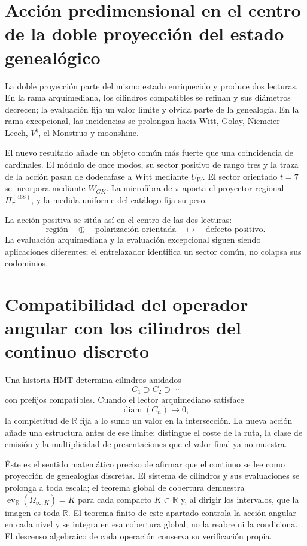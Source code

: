 \section{Acción predimensional en el centro de la doble proyección del estado genealógico}

La doble proyección parte del mismo estado enriquecido y produce dos
lecturas. En la rama arquimediana, los cilindros compatibles se refinan y
sus diámetros decrecen; la evaluación fija un valor límite y olvida parte
de la genealogía. En la rama excepcional, las incidencias se prolongan hacia
Witt, Golay, Niemeier--Leech, \(V^\natural\), el Monstruo y moonshine.

El nuevo resultado añade un objeto común más fuerte que una coincidencia de
cardinales. El módulo de once modos, su sector positivo de rango tres y la
traza de la acción pasan de dodecafase a Witt mediante \(U_W\). El sector orientado
\(t=7\) se incorpora mediante \(W_{GK}\). La microfibra de
\(\pi\) aporta el proyector regional \(\Pi_\pi^{(468)}\), y la medida uniforme del
catálogo fija su peso.

La acción positiva se sitúa así en el centro de las dos lecturas:
\[
 \text{región}
 \quad\oplus\quad
 \text{polarización orientada}
 \quad\longmapsto\quad
 \text{defecto positivo}.
\]
La evaluación arquimediana y la evaluación excepcional siguen siendo
aplicaciones diferentes; el entrelazador identifica un sector común, no
colapsa sus codominios.

\section{Compatibilidad del operador angular con los cilindros del continuo discreto}

Una historia HMT determina cilindros anidados
\[
 C_1\supset C_2\supset\cdots
\]
con prefijos compatibles. Cuando el lector arquimediano satisface
\[
 \operatorname{diam}(C_n)\longrightarrow0,
\]
la completitud de \(\mathbb R\) fija a lo sumo un valor en la intersección.
La nueva acción añade una estructura antes de ese límite: distingue el coste
de la ruta, la clase de emisión y la multiplicidad de presentaciones que el
valor final ya no muestra.

Éste es el sentido matemático preciso de afirmar que el continuo se lee como
proyección de genealogías discretas. El sistema de cilindros y sus
evaluaciones se prolonga a toda escala; el teorema global de cobertura
demuestra
\(\operatorname{ev}_{\mathbb R}(\Omega_{\infty,K})=K\) para cada compacto
\(K\subset\mathbb R\) y, al dirigir los intervalos, que la imagen es toda
\(\mathbb R\). El teorema finito de este apartado controla la acción angular
en cada nivel y se integra en esa cobertura global; no la reabre ni la
condiciona. El descenso algebraico de cada operación conserva su verificación
propia.

